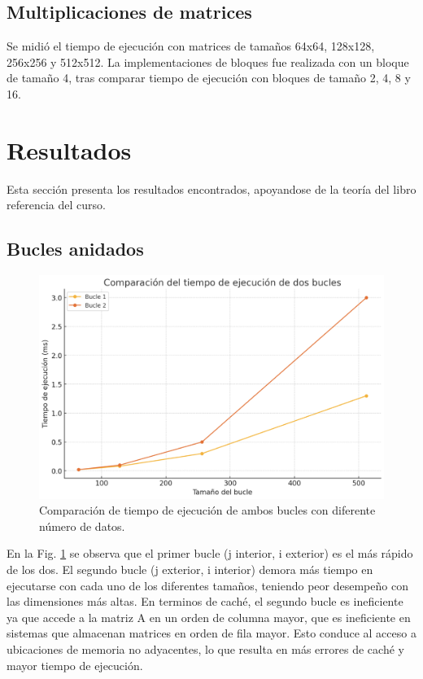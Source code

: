 \documentclass[conference]{IEEEtran}
\begin{document}
\subsection{Multiplicaciones de matrices}
Se midió el tiempo de ejecución con matrices de tamaños 64x64, 128x128, 256x256 y 512x512. La implementaciones de bloques fue realizada con un bloque de tamaño 4, tras comparar tiempo de ejecución con bloques de tamaño 2, 4, 8 y 16.

\section{Resultados}\label{sec:res}
Esta sección presenta los resultados encontrados, apoyandose de la teoría del libro referencia del curso. 
\subsection{Bucles anidados}
\begin{figure}
  \centering
  \includegraphics[width=\columnwidth]{figures/bucles.png}
  \caption{Comparación de tiempo de ejecución de ambos bucles con diferente número de datos.}
  \label{fig:bucles}
\end{figure}
En la Fig. \ref{fig:bucles} se observa que el primer bucle (j interior, i exterior) es el más rápido de los dos. El segundo bucle (j exterior, i interior) demora más tiempo en ejecutarse con cada uno de los diferentes tamaños, teniendo peor desempeño con las dimensiones más altas. En terminos de caché, el segundo bucle es ineficiente ya que accede a la matriz A en un orden de columna mayor, que es ineficiente en sistemas que almacenan matrices en orden de fila mayor. Esto conduce al acceso a ubicaciones de memoria no adyacentes, lo que resulta en más errores de caché y mayor tiempo de ejecución.\cite{pacheco2011introduction}
\end{document}
